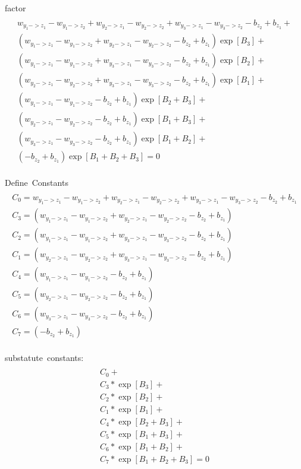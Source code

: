 \documentclass{article}
\begin{document}
\hbox{factor}
\begin{multline}\\
    w_{y_1->z_1} - w_{y_1->z_2} +
    w_{y_2->z_1} - w_{y_2->z_2} +
    w_{y_3->z_1} - w_{y_3->z_2} 
    - b_{z_2} + b_{z_1} +\\
    (w_{y_1->z_1} - w_{y_1->z_2}+ 
    w_{y_2->z_1} - w_{y_2->z_2} 
    - b_{z_2} + b_{z_1})\exp[B_3] +\\
    (w_{y_1->z_1} - w_{y_1->z_2}+ 
    w_{y_3->z_1} - w_{y_3->z_2}
    - b_{z_2} + b_{z_1})\exp[B_2] +\\
    (w_{y_2->z_1} - w_{y_2->z_2}+
    w_{y_3->z_1} - w_{y_3->z_2}
    - b_{z_2} + b_{z_1})\exp[B_1] +\\
    (w_{y_1->z_1} - w_{y_1->z_2} -
    b_{z_2} + b_{z_1})\exp[B_2+B_3] +\\ 
    (w_{y_2->z_1} - w_{y_2->z_2}
    - b_{z_2} + b_{z_1})\exp[B_1+B_3] +\\
    (w_{y_3->z_1} - w_{y_3->z_2}
    - b_{z_2} + b_{z_1})\exp[B_1+B_2] +\\
    (-b_{z_2} + b_{z_1})\exp[B_1+B_2+B_3] = 0\\
\end{multline}

\hbox{Define Constants}
\begin{multline}\\
    C_0 = w_{y_1->z_1} - w_{y_1->z_2} +
    w_{y_2->z_1} - w_{y_2->z_2} +
    w_{y_3->z_1} - w_{y_3->z_2} 
    - b_{z_2} + b_{z_1}\\
    C_3 = (w_{y_1->z_1} - w_{y_1->z_2}+ 
    w_{y_2->z_1} - w_{y_2->z_2} 
    - b_{z_2} + b_{z_1})\\
    C_2 = (w_{y_1->z_1} - w_{y_1->z_2}+ 
    w_{y_3->z_1} - w_{y_3->z_2}
    - b_{z_2} + b_{z_1})\\
    C_1 = (w_{y_2->z_1} - w_{y_2->z_2}+
    w_{y_3->z_1} - w_{y_3->z_2}
    - b_{z_2} + b_{z_1})\\
    C_4 = (w_{y_1->z_1} - w_{y_1->z_2} -
    b_{z_2} + b_{z_1})\\ 
    C_5 = (w_{y_2->z_1} - w_{y_2->z_2}
    - b_{z_2} + b_{z_1})\\
    C_6 = (w_{y_3->z_1} - w_{y_3->z_2}
    - b_{z_2} + b_{z_1})\\
    C_7 = (-b_{z_2} + b_{z_1})\\
\end{multline}

\hbox{substatute constants:}
\begin{multline}\\
    C_0 +\\
    C_3*\exp[B_3] +\\
    C_2*\exp[B_2] +\\
    C_1*\exp[B_1] +\\
    C_4*\exp[B_2+B_3] +\\ 
    C_5*\exp[B_1+B_3] +\\
    C_6*\exp[B_1+B_2] +\\
    C_7*\exp[B_1+B_2+B_3] = 0\\
\end{multline}
\end{document}
